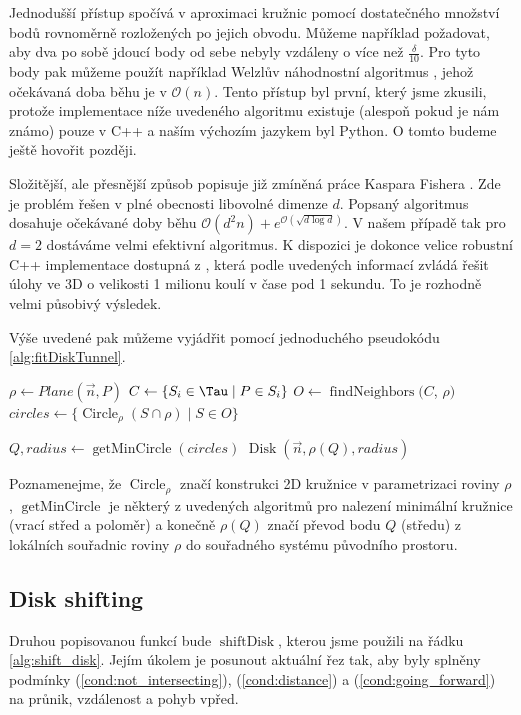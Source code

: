 Jednodušší přístup spočívá v aproximaci kružnic pomocí dostatečného množství bodů
rovnoměrně rozložených po jejich obvodu. Můžeme například požadovat, aby dva
po sobě jdoucí body od sebe nebyly vzdáleny o více než $ \frac{\delta}{10} $.
Pro tyto body pak můžeme použít například Welzlův náhodnostní algoritmus
\cite{WelzlRandom}, jehož očekávaná doba běhu je v $ \mathcal{O}(n) $. Tento
přístup byl první, který jsme zkusili, protože implementace níže uvedeného algoritmu
existuje (alespoň pokud je nám známo) pouze v C++ a naším výchozím jazykem byl
Python. O tomto budeme ještě hovořit později.

Složitější, ale přesnější způsob popisuje již zmíněná práce Kaspara Fishera
\cite{FisherBalls}. Zde je problém řešen v plné obecnosti libovolné dimenze $ d $.
Popsaný algoritmus dosahuje očekávané doby běhu
$ \mathcal{O}(d^2n) + e^{\mathcal{O}(\sqrt{d \log{d}})} $. V našem případě tak pro
$ d = 2 $ dostáváme velmi efektivní algoritmus. K dispozici je dokonce velice
robustní C++ implementace dostupná z \cite{cpp_balls}, která podle uvedených informací
zvládá řešit úlohy ve 3D o velikosti 1 milionu koulí v čase pod 1 sekundu. To
je rozhodně velmi působivý výsledek.

Výše uvedené pak můžeme vyjádřit pomocí jednoduchého pseudokódu \ref{alg:fitDiskTunnel}.

\begin{algorithmic}[1]
\label{alg:fitDiskTunnel}

    \State $ \rho \gets Plane(\vec{n}, P) $
    \State $ C \gets \{S_i \in \Tau \mid P \in S_i \} $
    \State $ O \gets \operatorname{findNeighbors}(C$, $\rho)$
    \State $ circles \gets \{ \operatorname{Circle}_{\rho}(S \cap \rho) \mid S \in O \} $
    \State

    \State $ Q, radius \gets \operatorname{getMinCircle}(circles) $
    \State \Return $ \operatorname{Disk}(\vec{n}, \rho(Q), radius) $
\EndFunction

\end{algorithmic}

Poznamenejme, že $ \operatorname{Circle}_{\rho} $ značí konstrukci 2D kružnice
v parametrizaci roviny $ \rho $, $ \operatorname{getMinCircle} $ je některý z
uvedených algoritmů pro nalezení minimální kružnice (vrací střed a poloměr)
a konečně $ \rho(Q) $ značí převod bodu $ Q $ (středu) z lokálních souřadnic
roviny $ \rho $ do souřadného systému původního prostoru.



\subsection{Disk shifting} \label{subsec:disk_shift}
Druhou popisovanou funkcí bude $ \operatorname{shiftDisk} $, kterou jsme použili
na řádku \ref{alg:shift_disk}. Jejím úkolem je posunout aktuální řez tak, aby
byly splněny podmínky (\ref{cond:not_intersecting}), (\ref{cond:distance})
a (\ref{cond:going_forward}) na průnik, vzdálenost a pohyb vpřed.

